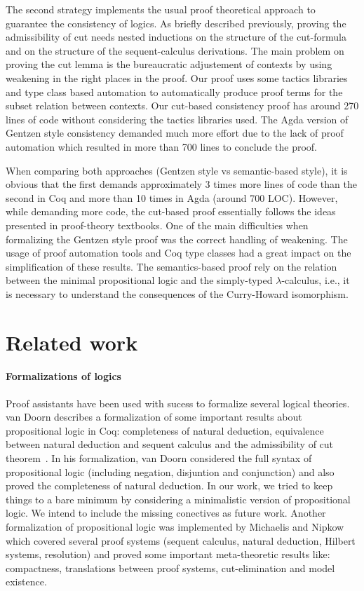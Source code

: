 The second strategy implements the usual proof theoretical approach to guarantee
the consistency of logics. As briefly described previously, proving
the admissibility of cut needs nested inductions on the structure of the cut-formula
and on the structure of the sequent-calculus derivations. The main problem on proving
the cut lemma is the bureaucratic adjustement of contexts by using weakening in the
right places in the proof. Our proof uses some tactics libraries~\cite{Chlipala13, Pierce18}
and type class based automation to automatically produce proof terms for the subset relation
between contexts. Our cut-based consistency proof has around 270 lines of code without
considering the tactics libraries used. The Agda version of Gentzen style consistency demanded
much more effort due to the lack of proof automation which resulted in more than 700 lines to conclude
the proof.


When comparing both approaches (Gentzen style vs semantic-based style), it is obvious that the
first demands approximately 3 times more lines of code than the second in Coq and more than 10
times in Agda (around 700 LOC).
However, while demanding more code, the cut-based proof essentially follows the ideas presented in
proof-theory textbooks. One of the main difficulties when formalizing the Gentzen style proof was the correct handling of
weakening. The usage of proof automation tools and Coq type classes had a great impact
on the simplification of these results.
The semantics-based proof rely on the relation between the minimal propositional logic and
the simply-typed $\lambda$-calculus, i.e., it is necessary to understand the consequences
of the Curry-Howard isomorphism.


\section{Related work}\label{sec:related}


\paragraph{Formalizations of logics}Proof assistants have been used with sucess to formalize
several logical theories. van Doorn describes a formalization of some important results about
propositional logic in Coq: completeness of natural deduction, equivalence between natural
deduction and sequent calculus and the admissibility of cut theorem~\cite{doorn2015}. In his formalization,
van Doorn considered the full syntax of propositional logic (including negation, disjuntion and conjunction) and
also proved the completeness of natural deduction. In our work, we tried to keep things to a bare minimum by
considering a minimalistic version of propositional logic. We intend to include the missing conectives as
future work. Another formalization of propositional logic was implemented by Michaelis and Nipkow~\cite{Nipkow17} which
covered several proof systems (sequent calculus, natural deduction, Hilbert systems, resolution) and proved some
important meta-theoretic results like: compactness, translations between proof systems, cut-elimination and model existence.


